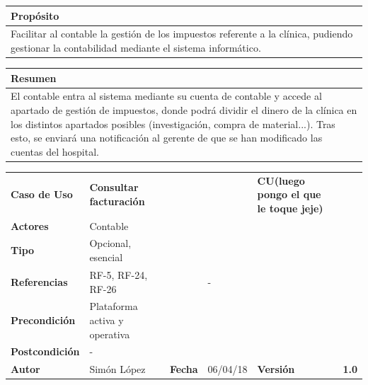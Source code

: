 \documentclass[11pt,a4paper]{article}
\begin{document}
\begin{table}[H]
	\centering
	\begin{tabular}{l}
		\hline
		\multicolumn{1}{|l|}{Propósito} \\ \hline
		Facilitar al contable la gestión de los impuestos referente a la clínica, pudiendo gestionar la contabilidad mediante el sistema informático.
	\end{tabular}
\end{table}

\begin{table}[H]
	\centering
	\begin{tabular}{l}
		\hline
		\multicolumn{1}{|l|}{Resumen} \\ \hline
		El contable entra al sistema mediante su cuenta de contable y accede al apartado de gestión de impuestos, donde podrá dividir el dinero de la clínica en los distintos apartados posibles (investigación, compra de material...). Tras esto, se enviará una notificación al gerente de que se han modificado las cuentas del hospital. 
	\end{tabular}
\end{table}


\begin{table}[H]
	\centering
	\begin{tabular}{|l|lllll}
		\cline{1-1} \cline{6-6}
		\textbf{Caso de Uso}   & \textbf{Consultar facturación} &   &  & \multicolumn{1}{l|}{\textbf{\textbf{CU(luego pongo el que le toque jeje)}}}        & \multicolumn{1}{l|}{\textbf{}} \\ \cline{1-1} \cline{6-6} 
		\textbf{Actores}       & Contable &                                     &                       &                                       & \textbf{}                      \\ \cline{1-1}
		\textbf{Tipo}          & Opcional, esencial  &                                     &                       &                                       & \textbf{}                      \\ \cline{1-1}
		\textbf{Referencias}   & RF-5, RF-24, RF-26                         &     & -                     &                                       & \textbf{}                      \\ \cline{1-1}
		\textbf{Precondición}  & Plataforma activa y operativa                    &                      &                                       & \textbf{}                      \\ \cline{1-1}
		\textbf{Postcondición} & -                                                                                        &                      &                &                &               \\ \cline{1-1} \cline{3-3} \cline{5-5}
		\textbf{Autor}         & \multicolumn{1}{l|}{Simón López} & \multicolumn{1}{l|}{\textbf{Fecha}} & \multicolumn{1}{l|}{06/04/18} & \multicolumn{1}{l|}{\textbf{Versión}} & \textbf{1.0}                      \\ \cline{1-1} \cline{3-3} \cline{5-5}
	\end{tabular}
\end{table}
\end{document}

